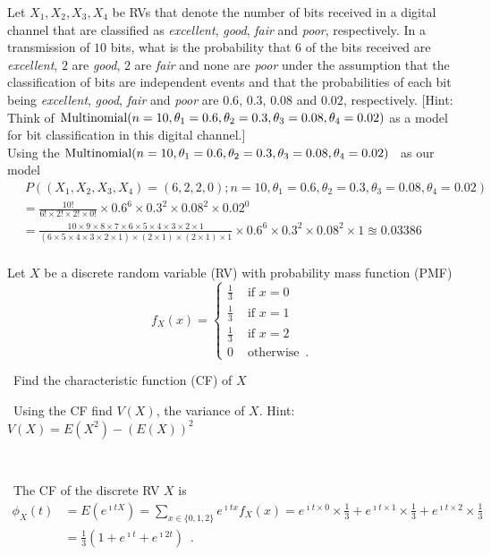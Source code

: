 \begin{ExerciseList}
\Exercise
Let $X_1,X_2,X_3,X_4$ be RVs that denote the number of bits received in a digital channel that are classified as {\em excellent}, {\em good}, {\em fair} and {\em poor}, respectively.  
In a transmission of $10$ bits, what is the probability that $6$ of the bits received are {\em excellent}, $2$ are {\em good}, $2$ are {\em fair} and none are {\em poor} under the assumption that the classification of bits are independent events and that the probabilities of each bit being {\em excellent}, {\em good}, {\em fair} and {\em poor} are $0.6$, $0.3$, $0.08$ and $0.02$, respectively. 
[Hint: Think of $\mbox{{\rm Multinomial}}(n=10,\theta_1=0.6,\theta_2=0.3,\theta_3=0.08,\theta_4=0.02)$ as a model for bit classification in this digital channel.]
\Answer
~\\
Using the $\mbox{{\rm Multinomial}}(n=10,\theta_1=0.6,\theta_2=0.3,\theta_3=0.08,\theta_4=0.02)$ \rv~as our model
\begin{align*}
&~ P\left( (X_1,X_2,X_3,X_4)=(6,2,2,0); n=10,\theta_1=0.6,\theta_2=0.3,\theta_3=0.08,\theta_4=0.02 \right)\\ 
&= \frac{10!}{6! \times 2! \times 2! \times 0!} \times 0.6^6 \times 0.3^2 \times 0.08^2 \times 0.02^0\\
&= \frac{10 \times 9 \times 8 \times 7 \times 6 \times 5 \times 4 \times 3 \times 2 \times 1}{(6 \times 5 \times 4 \times 3 \times 2 \times 1) \times (2 \times 1) \times (2 \times 1) \times 1} \times  0.6^6 \times 0.3^2 \times 0.08^2 \times 1 \approxeq 0.03386\\
\end{align*}

\Exercise
Let $X$ be a discrete random variable (RV) with probability mass function (PMF)
\[
f_X(x) = 
\begin{cases}
\frac{1}{3} & \text{ if } x=0\\
\frac{1}{3} & \text{ if } x=1\\
\frac{1}{3} & \text{ if } x=2\\
0 & \text{ otherwise} \enspace .
\end{cases}
\]
\be
\item~Find the characteristic function (CF) of $X$
\item~Using the CF find $V(X)$, the variance of $X$. {Hint: $V(X)=E(X^2)-(E(X))^2$}
\ee

\Answer
~\\
\be
\item~The CF of the discrete RV $X$ is
\begin{align*}
\phi_X(t) 
&= E(e^{\imath t X}) = \sum_{x\in\{0,1,2\}} e^{\imath t x} f_X(x)
= e^{\imath t \times 0} \times \frac{1}{3} + e^{\imath t \times 1} \times \frac{1}{3}+e^{\imath t \times 2} \times \frac{1}{3}\\
&= \frac{1}{3} \left(1+e^{\imath t} + e^{\imath 2 t}\right) \enspace .
\end{align*}


\end{ExerciseList}

